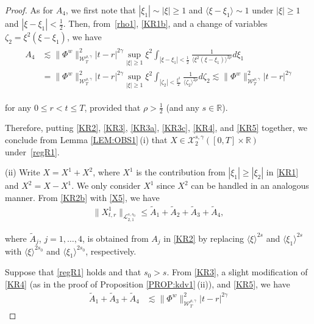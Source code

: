 \documentclass[letterpaper, 11pt,  reqno]{amsart}
\DeclareMathOperator*{\intt}{\int}
\newcommand{\1}{\hspace{0.5mm}\text{I}\hspace{0.5mm}}
\newcommand{\noi}{\noindent}
\newcommand{\R}{\mathbb{R}}
\newcommand{\g}{\gamma}
\newcommand{\wt}{\widetilde}
\newcommand{\les}{\lesssim}
\newcommand{\jb}[1]
{\langle #1 \rangle}
\newcommand{\cL}{\mathcal{L}}
\newcommand{\cX}{\mathcal{X}}
\newcommand{\W}{\mathcal{W}}
\newcommand{\z}{\zeta}
\numberwithin{equation}{section}
\numberwithin{theorem}{section}
\begin{document}
\begin{proof}
As for $A_4$, 
we first note that 
$ |\xi_1|\sim |\xi| \ge 1$
and $\jb{\xi - \xi_1}\sim 1$
under 
 $|\xi|\ge1$ and $|\xi - \xi_1|< \frac12 $.
 Then, from~\eqref{rho1}, \eqref{KR1b},  and 
 a change of variables $\zeta_2 = \xi^2 (\xi - \xi_1)$, we have 
 \begin{align}
\begin{aligned}
A_4
&\les
\|\Phi^w\|^2_{\W_T^{\rho,\g}}
|t-r |^{2\g }    \sup_{|\xi|\ge 1}  \xi^2
  \intt_{|\xi - \xi_1|< \frac 12} 
\frac{ 1}{  \jb{\xi^2(\xi - \xi_1)}^{2\rho}} d \xi_1\\
&= 
\|\Phi^w\|^2_{\W_T^{\rho,\g}}
|t-r |^{2\g }  
   \sup_{|\xi|\ge 1}  \xi^2
  \intt_{|\z_2|< \frac {\xi^2}2} 
 \frac{1}{\jb{\z_2}^{2\rho} }d \z_2
 \les \|\Phi^w\|^2_{\W_T^{\rho,\g}}
|t-r |^{2\g } 
\end{aligned}
\label{KR5}
\end{align}

\noi
for any $0 \le r <  t \le T$, provided that $\rho > \frac 12$
(and any $s \in \R$).



Therefore, putting \eqref{KR2}, 
\eqref{KR3}, 
\eqref{KR3a}, 
\eqref{KR3c}, 
\eqref{KR4}, and \eqref{KR5}
together, we conclude 
from  Lemma \ref{LEM:OBS1}\,(i)
that 
 $X\in  \cX^{s, \g}_2([0, T]\times \R)$ under~\eqref{regR1}.




\medskip

\noi
(ii)  Write $X = X^1 + X^2$, 
where $X^1$ is the contribution from $|\xi_1| \ge |\xi_2|$ in \eqref{KR1}
and $X^2 = X - X^1$.
We only consider $X^1$ since $X^2$ can be handled 
in an analogous manner.
From \eqref{KR2b}
with \eqref{X5}, we have 
\begin{align*}
\|X^1_{t,r} \|_{\cL_{2, 1}^{s, s_0}}
 \le \wt A_1+ \wt A_2 + \wt A_3 +\wt  A_4, 
\end{align*}




\noi
where $\wt A_j$, $j = 1, \dots, 4$, 
is obtained from $A_j$ in \eqref{KR2}
by replacing 
$\jb{\xi}^{2s}$
and $\jb{\xi_1}^{2s}$
with $\jb{\xi}^{2s_0}$
and $\jb{\xi_1}^{2s_0}$, respectively.
 

Suppose that  \eqref{regR1} holds and that $s_0 > s$.
From 
\eqref{KR3}, 
a slight modification of \eqref{KR4}
(as in the proof of Proposition \ref{PROP:kdv1}\,(ii)), and 
\eqref{KR5}, 
we have 
\begin{align*}
\wt A_1 + 
\wt A_3 + 
\wt A_4
& \les
\|\Phi^w\|^2_{\W_T^{\rho,\g}}|t-r |^{2\g}
\end{align*}


\end{proof}
\end{document}
